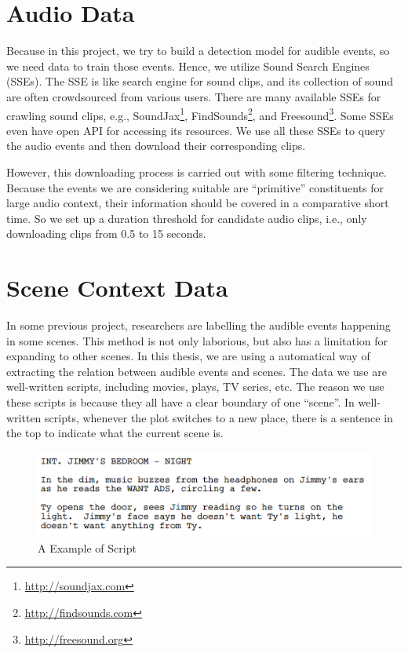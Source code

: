 \section{Audio Data}
Because in this project, we try to build a detection model for audible events, so we need data to train those events. 
Hence, we utilize Sound Search Engines (SSEs). 
The SSE is like search engine for sound clips, and its collection of sound are often crowdsourced from various users. 
There are many available SSEs for crawling sound clips, e.g., SoundJax\footnote{\url{http://soundjax.com}}, FindSounds\footnote{\url{http://findsounds.com}}, and Freesound\footnote{\url{http://freesound.org}}. 
Some SSEs even have open API for accessing its resources. 
We use all these SSEs to query the audio events and then download their corresponding clips. 

However, this downloading process is carried out with some filtering technique. 
Because the events we are considering suitable are ``primitive'' constituents for large audio context, their information should be covered in a comparative short time. 
So we set up a duration threshold for candidate audio clips, i.e., only downloading clips from 0.5 to 15 seconds.  

\section{Scene Context Data}
In some previous project, researchers are labelling the audible events happening in some scenes. 
This method is not only laborious, but also has a limitation for expanding to other scenes.
In this thesis, we are using a automatical way of extracting the relation between audible events and scenes.
The data we use are well-written scripts, including movies, plays, TV series, etc. 
The reason we use these scripts is because they all have a clear boundary of one ``scene''. 
In well-written scripts, whenever the plot switches to a new place, there is a sentence in the top to indicate what the current scene is. 
\begin{figure}[htb]
\centering
\includegraphics[scale=0.6]{figure/dataprep/script}
\caption{A Example of Script}
\label{fig:script}
\end{figure}

